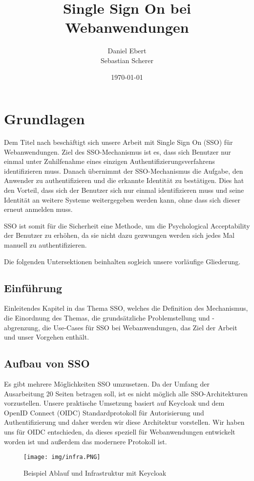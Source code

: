 \documentclass[12pt]{article}
\title{Single Sign On bei Webanwendungen}
\author{Daniel Ebert \\
	Sebastian Scherer}
\date{\today}
\begin{document}
\maketitle
	
\section{Grundlagen}
Dem Titel nach beschäftigt sich unsere Arbeit mit Single Sign On (SSO) für Webanwendungen.
Ziel des SSO-Mechanismus ist es, dass sich Benutzer nur einmal unter Zuhilfenahme eines einzigen Authentifizierungsverfahrens identifizieren muss.
Danach übernimmt der SSO-Mechanismus die Aufgabe, den Anwender zu authentifizieren und die erkannte Identität zu bestätigen. Dies hat den Vorteil, dass sich der Benutzer sich nur einmal identifizieren muss und seine Identität an weitere Systeme weitergegeben werden kann, ohne dass sich dieser erneut anmelden muss.

SSO ist somit für die Sicherheit eine Methode, um die Psychological Acceptability der Benutzer zu erhöhen, da sie nicht dazu gezwungen werden sich jedes Mal manuell zu authentifizieren.

Die folgenden Untersektionen beinhalten sogleich unsere vorläufige Gliederung.

\subsection{Einführung}	
Einleitendes Kapitel in das Thema SSO, welches die Definition des Mechanismus, die Einordnung des Themas, die grundsätzliche Problemstellung und -abgrenzung, die Use-Cases für SSO bei Webanwendungen, das Ziel der Arbeit und unser Vorgehen enthält.

\subsection{Aufbau von SSO}
Es gibt mehrere Möglichkeiten SSO umzusetzen. Da der Umfang der Ausarbeitung 20 Seiten betragen soll, ist es nicht möglich alle SSO-Architekturen vorzustellen. Unsere praktische Umsetzung basiert auf Keycloak und dem OpenID Connect (OIDC) Standardprotokoll für Autorisierung und Authentifizierung und daher werden wir diese Architektur vorstellen. Wir haben uns für OIDC entschieden, da dieses speziell für Webanwendungen entwickelt worden ist und außerdem das modernere Protokoll ist. \cite{keycloakOpenID}

\begin{figure}[h]
    \centering
    \texttt{[image: img/infra.PNG]}
    \caption{Beispiel Ablauf und Infrastruktur mit Keycloak}
    \label{fig:infra}
\end{figure}
\end{document}
